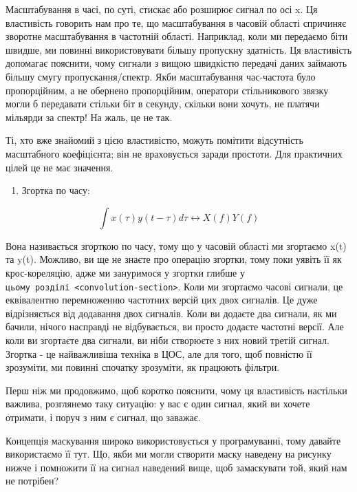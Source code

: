Масштабування в часі, по суті, стискає або розширює сигнал по осі x. Ця
властивість говорить нам про те, що масштабування в часовій області
спричиняє зворотне масштабування в частотній області. Наприклад, коли ми
передаємо біти швидше, ми повинні використовувати більшу пропускну
здатність. Ця властивість допомагає пояснити, чому сигнали з вищою
швидкістю передачі даних займають більшу смугу пропускання/спектр. Якби
масштабування час-частота було пропорційним, а не обернено пропорційним,
оператори стільникового зв\textquotesingle язку могли б передавати
стільки біт в секунду, скільки вони хочуть, не платячи мільярди за
спектр! На жаль, це не так.

Ті, хто вже знайомий з цією властивістю, можуть помітити відсутність
масштабного коефіцієнта; він не враховується заради простоти. Для
практичних цілей це не має значення.

\begin{enumerate}
\def\labelenumi{\arabic{enumi}.}
\setcounter{enumi}{3}
\tightlist
\item
  Згортка по часу:
\end{enumerate}

\[\int x(\tau) y(t-\tau) d\tau \leftrightarrow X(f)Y(f)\]

Вона називається згорткою по часу, тому що у часовій області ми
згортаємо x(t) та y(t). Можливо, ви ще не знаєте про операцію згортки,
тому поки уявіть її як крос-кореляцію, адже ми зануримося у згортки
глибше у
\texttt{цьому\ розділі\ \textless{}convolution-section\textgreater{}}.
Коли ми згортаємо часові сигнали, це еквівалентно перемноженню частотних
версій цих двох сигналів. Це дуже відрізняється від додавання двох
сигналів. Коли ви додаєте два сигнали, як ми бачили, нічого насправді не
відбувається, ви просто додаєте частотні версії. Але коли ви згортаєте
два сигнали, ви ніби створюєте з них новий третій сигнал. Згортка - це
найважливіша техніка в ЦОС, але для того, щоб повністю її зрозуміти, ми
повинні спочатку зрозуміти, як працюють фільтри.

Перш ніж ми продовжимо, щоб коротко пояснити, чому ця властивість
настільки важлива, розглянемо таку ситуацію: у вас є один сигнал, який
ви хочете отримати, і поруч з ним є сигнал, що заважає.

\href{../_images/two-signals.svg}{}

Концепція маскування широко використовується у програмуванні, тому
давайте використаємо її тут. Що, якби ми могли створити маску наведену
на рисунку нижче і помножити її на сигнал наведений вище, щоб
замаскувати той, який нам не потрібен?

